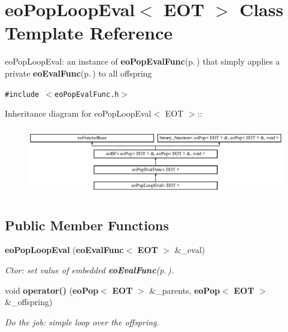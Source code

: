 \section{eo\-Pop\-Loop\-Eval$<$ EOT $>$ Class Template Reference}
\label{classeo_pop_loop_eval}
eo\-Pop\-Loop\-Eval: an instance of {\bf eo\-Pop\-Eval\-Func}{\rm (p.\,\pageref{classeo_pop_eval_func})} that simply applies a private {\bf eo\-Eval\-Func}{\rm (p.\,\pageref{classeo_eval_func})} to all offspring  


{\tt \#include $<$eo\-Pop\-Eval\-Func.h$>$}

Inheritance diagram for eo\-Pop\-Loop\-Eval$<$ EOT $>$::\begin{figure}[H]
\begin{center}
\leavevmode
\includegraphics[height=3.01075cm]{classeo_pop_loop_eval}
\end{center}
\end{figure}
\subsection*{Public Member Functions}
\begin{CompactItemize}
\item 
{\bf eo\-Pop\-Loop\-Eval} ({\bf eo\-Eval\-Func}$<$ {\bf EOT} $>$ \&\_\-eval)\label{classeo_pop_loop_eval_a0}

\begin{CompactList}\small\item\em Ctor: set value of embedded {\bf eo\-Eval\-Func}{\rm (p.\,\pageref{classeo_eval_func})}. \item\end{CompactList}\item 
void {\bf operator()} ({\bf eo\-Pop}$<$ {\bf EOT} $>$ \&\_\-parents, {\bf eo\-Pop}$<$ {\bf EOT} $>$ \&\_\-offspring)\label{classeo_pop_loop_eval_a1}

\begin{CompactList}\small\item\em Do the job: simple loop over the offspring. \item\end{CompactList}\end{CompactItemize}
